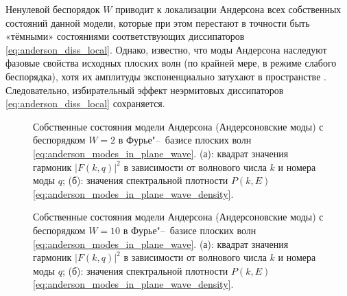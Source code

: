 Ненулевой беспорядок \(W\) приводит к локализации Андерсона всех собственных состояний данной модели, которые при этом перестают в точности быть «тёмными» состояниями соответствующих диссипаторов \cref{eq:anderson_diss_local}.
Однако, известно, что моды Андерсона наследуют фазовые свойства исходных плоских волн (по крайней мере, в режиме слабого беспорядка), хотя их амплитуды экспоненциально затухают в пространстве \cite{Ishii1973}.
Следовательно, избирательный эффект неэрмитовых диссипаторов \cref{eq:anderson_diss_local} сохраняется.
\begin{figure}[h]
	\legend{}
	\caption[Анализ Андерсоновских мод в Фурье"--~базисе для слабого беспорядка]
	{
		Собственные состояния модели Андерсона (Андерсоновские моды) с беспорядком \(W=2\) в Фурье"--~базисе плоских волн \cref{eq:anderson_modes_in_plane_wave}. (а): квадрат значения гармоник \(\left| F(k,q) \right|^2\) в зависимости от волнового числа \(k\) и номера моды \(q\); (б): значения спектральной плотности \(P(k,E)\) \cref{eq:anderson_modes_in_plane_wave_density}.
	}
	\label{fig:anderson_modes_in_foutier_1}
\end{figure}
\begin{figure}[h]
	\legend{}
	\caption[Анализ Андерсоновских мод в Фурье"--~базисе для сильного беспорядка]
	{
		Собственные состояния модели Андерсона (Андерсоновские моды) с беспорядком \(W=10\) в Фурье"--~базисе плоских волн \cref{eq:anderson_modes_in_plane_wave}. (а): квадрат значения гармоник \(\left| F(k,q) \right|^2\) в зависимости от волнового числа \(k\) и номера моды \(q\); (б): значения спектральной плотности \(P(k,E)\) \cref{eq:anderson_modes_in_plane_wave_density}.
	}
	\label{fig:anderson_modes_in_foutier_2}
\end{figure}
